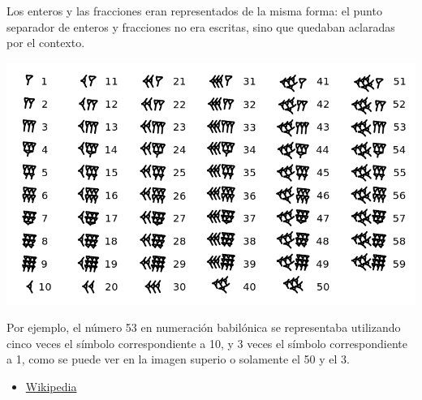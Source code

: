 \begin{problem}[1]
Los enteros y las fracciones eran representados de la misma forma: el punto separador de enteros y fracciones no era escritas, sino que quedaban aclaradas por el contexto.


\begin{center}
\includegraphics[width=0.8\linewidth]{img/numeros_babilonicos.png}
\end{center}


Por ejemplo, el número 53 en numeración babilónica se representaba utilizando cinco veces el símbolo correspondiente a 10, y 3 veces el símbolo correspondiente a 1, como se puede ver en la imagen superio o solamente el 50 y el 3.

\begin{itemize}
\item \href{https://es.wikipedia.org/wiki/Numeracion_babilonica}{Wikipedia}
\end{itemize}
\end{problem}


